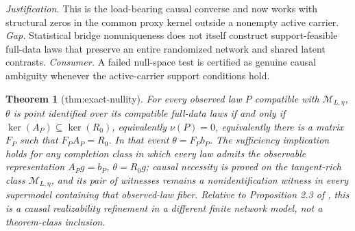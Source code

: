\documentclass{article}
\newtheorem{theorem}{Theorem}
\begin{document}
\par\smallskip\noindent \textit{Justification.} This is the load-bearing causal converse and now works with structural zeros in the common proxy kernel outside a nonempty active carrier. \textit{Gap.} Statistical bridge nonuniqueness does not itself construct support-feasible full-data laws that preserve an entire randomized network and shared latent contrasts. \textit{Consumer.} A failed null-space test is certified as genuine causal ambiguity whenever the active-carrier support conditions hold.

\begin{theorem}[thm:exact-nullity]\label{thm:exact-nullity}
For every observed law \(P\) compatible with \(\mathcal M_{L,\eta}\), \(\theta\) is point identified over its compatible full-data laws if and only if \(\ker(A_P)\subseteq\ker(R_0)\), equivalently \(\nu(P)=0\), equivalently there is a matrix \(F_P\) such that \(F_PA_P=R_0\).  In that event \(\theta=F_Pb_P\).  The sufficiency implication holds for any completion class in which every law admits the observable representation \(A_Pg=b_P\), \(\theta=R_0g\); causal necessity is proved on the tangent-rich class \(\mathcal M_{L,\eta}\), and its pair of witnesses remains a nonidentification witness in every supermodel containing that observed-law fiber.  Relative to Proposition 2.3 of \cite{ZhangLiMiaoTchetgen2023}, this is a causal realizability refinement in a different finite network model, not a theorem-class inclusion.
\end{theorem}
\end{document}

